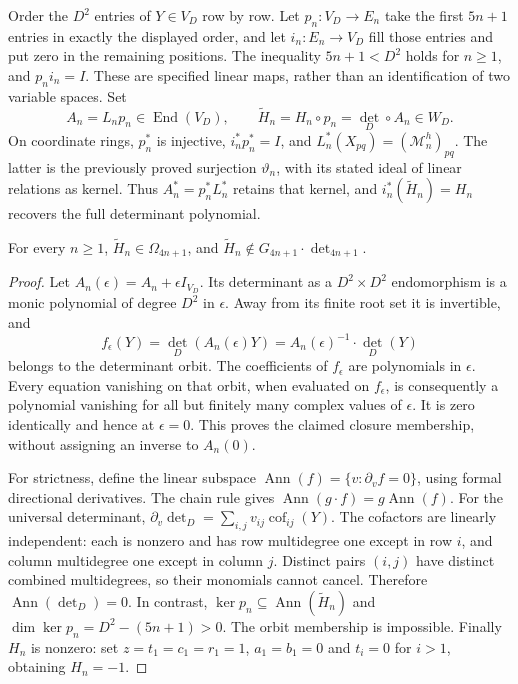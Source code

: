 Order the $D^2$ entries of $Y\in V_D$ row by row. Let
$p_n:V_D\to E_n$ take the first $5n+1$ entries in exactly the displayed
order, and let $i_n:E_n\to V_D$ fill those entries and put zero in
the remaining positions. The inequality $5n+1<D^2$ holds for $n\ge1$,
and $p_ni_n=I$. These are specified linear maps, rather than an
identification of two variable spaces. Set
\[
 A_n=L_np_n\in\operatorname{End}(V_D),\qquad
 \widetilde H_n=H_n\circ p_n=\det_D\circ A_n\in W_D.
\]
On coordinate rings, $p_n^*$ is injective, $i_n^*p_n^*=I$, and
$L_n^*(X_{pq})=(\mathcal M_n^h)_{pq}$. The latter is the previously
proved surjection $\vartheta_n$, with its stated ideal of linear
relations as kernel. Thus $A_n^*=p_n^*L_n^*$ retains that kernel,
and $i_n^*(\widetilde H_n)=H_n$ recovers the full determinant polynomial.

\begin{proposition}\label{prop:retained-determinant-boundary}
For every $n\ge1$, $\widetilde H_n\in\Omega_{4n+1}$, and
$\widetilde H_n\notin G_{4n+1}\cdot\det_{4n+1}$.
\end{proposition}
\begin{proof}
Let $A_n(\epsilon)=A_n+\epsilon I_{V_D}$. Its determinant as a
$D^2\times D^2$ endomorphism is a monic polynomial of degree $D^2$
in $\epsilon$. Away from its finite root set it is invertible, and
\[
 f_\epsilon(Y)=\det_D(A_n(\epsilon)Y)
             =A_n(\epsilon)^{-1}\cdot\det_D(Y)
\]
belongs to the determinant orbit. The coefficients of $f_\epsilon$
are polynomials in $\epsilon$. Every equation vanishing on that orbit,
when evaluated on $f_\epsilon$, is consequently a polynomial vanishing
for all but finitely many complex values of $\epsilon$. It is zero
identically and hence at $\epsilon=0$. This proves the claimed closure
membership, without assigning an inverse to $A_n(0)$.

For strictness, define the linear subspace
$\operatorname{Ann}(f)=\{v:\partial_v f=0\}$, using formal directional
derivatives. The chain rule gives
$\operatorname{Ann}(g\cdot f)=g\operatorname{Ann}(f)$.
For the universal determinant,
$\partial_v\det_D=\sum_{i,j}v_{ij}\operatorname{cof}_{ij}(Y)$.
The cofactors are linearly independent: each is nonzero and has row
multidegree one except in row $i$, and column multidegree one except
in column $j$. Distinct pairs $(i,j)$ have distinct combined
multidegrees, so their monomials cannot cancel. Therefore
$\operatorname{Ann}(\det_D)=0$. In contrast,
$\ker p_n\subseteq\operatorname{Ann}(\widetilde H_n)$ and
$\dim\ker p_n=D^2-(5n+1)>0$. The orbit membership is impossible.
Finally $H_n$ is nonzero: set $z=t_1=c_1=r_1=1$, $a_1=b_1=0$
and $t_i=0$ for $i>1$, obtaining $H_n=-1$.
\end{proof}

